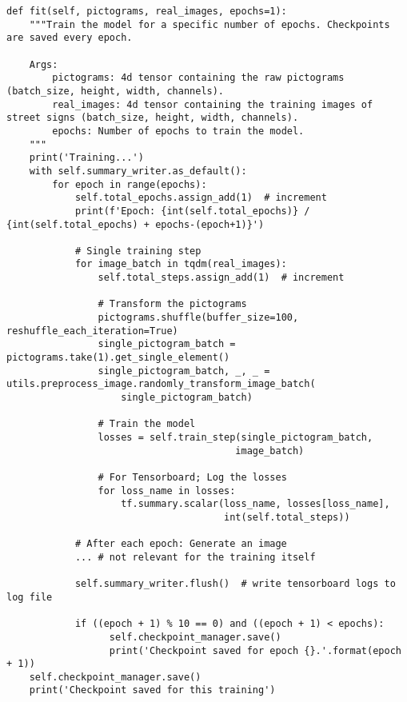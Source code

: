 \begin{code}
  \begin{verbatim}
def fit(self, pictograms, real_images, epochs=1):
    """Train the model for a specific number of epochs. Checkpoints are saved every epoch.

    Args:
        pictograms: 4d tensor containing the raw pictograms (batch_size, height, width, channels).
        real_images: 4d tensor containing the training images of street signs (batch_size, height, width, channels).
        epochs: Number of epochs to train the model.
    """
    print('Training...')
    with self.summary_writer.as_default():
        for epoch in range(epochs):
            self.total_epochs.assign_add(1)  # increment
            print(f'Epoch: {int(self.total_epochs)} / {int(self.total_epochs) + epochs-(epoch+1)}')

            # Single training step
            for image_batch in tqdm(real_images):
                self.total_steps.assign_add(1)  # increment

                # Transform the pictograms
                pictograms.shuffle(buffer_size=100, reshuffle_each_iteration=True)
                single_pictogram_batch = pictograms.take(1).get_single_element()
                single_pictogram_batch, _, _ = utils.preprocess_image.randomly_transform_image_batch(
                    single_pictogram_batch)

                # Train the model
                losses = self.train_step(single_pictogram_batch, 
                                        image_batch)

                # For Tensorboard; Log the losses
                for loss_name in losses:
                    tf.summary.scalar(loss_name, losses[loss_name], 
                                      int(self.total_steps))

            # After each epoch: Generate an image
            ... # not relevant for the training itself
            
            self.summary_writer.flush()  # write tensorboard logs to log file

            if ((epoch + 1) % 10 == 0) and ((epoch + 1) < epochs):
                  self.checkpoint_manager.save()
                  print('Checkpoint saved for epoch {}.'.format(epoch + 1))
    self.checkpoint_manager.save()
    print('Checkpoint saved for this training')
    
\end{verbatim}
  \label{lst:fit-full}
  \end{code}

